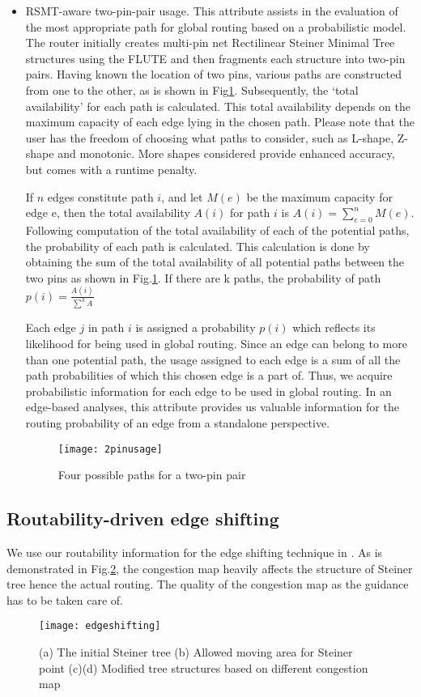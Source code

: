 \begin{itemize}
\item RSMT-aware two-pin-pair usage. This attribute assists in the evaluation of the most appropriate path for global routing based on a probabilistic model. The router initially creates multi-pin net Rectilinear Steiner Minimal Tree structures using the FLUTE \cite{FLUTE} and then fragments each structure into two-pin pairs. Having known the location of two pins, various paths are constructed from one to the other, as is shown in Fig\ref{fig:2pinusage}. Subsequently, the ‘total availability’ for each path is calculated. This total availability depends on the maximum capacity of each edge lying in the chosen path. Please note that the user has the freedom of choosing what paths to consider, such as L-shape, Z-shape and monotonic. More shapes considered provide enhanced accuracy, but comes with a runtime penalty.

If $n$ edges constitute path $i$, and let $M(e)$ be the maximum capacity for edge e, then the total availability $A(i)$ for path $i$ is $A(i)=\sum_{e=0}^{n}M(e)$. Following computation of the total availability of each of the potential paths, the probability of each path is calculated. This calculation is done by obtaining the sum of the total availability of all potential paths between the two pins as shown in Fig.\ref{fig:2pinusage}. If there are k paths, the probability of path $p(i)=\frac{A(i)}{\sum^{k}A}$

Each edge $j$ in path $i$ is assigned a probability $p(i)$ which reflects its likelihood for being used in global routing. Since an edge can belong to more than one potential path, the usage assigned to each edge is a sum of all the path probabilities of which this chosen edge is a part of. Thus, we acquire probabilistic information for each edge to be used in global routing. In an edge-based analyses, this attribute provides us valuable information for the routing probability of an edge from a standalone perspective.
\begin{figure}[htbp]
	\centerline{\texttt{[image: 2pinusage]}}
	\caption{Four possible paths for a two-pin pair}
	\label{fig:2pinusage}
\end{figure}
\end{itemize}

\subsection{Routability-driven edge shifting}
We use our routability information for the edge shifting technique in \cite{fastroute}. As is demonstrated in Fig.\ref{fig:edgeshifting}, the congestion map heavily affects the structure of Steiner tree hence the actual routing. The quality of the congestion map as the guidance has to be taken care of.
\begin{figure}[htbp]
	\centerline{\texttt{[image: edgeshifting]}}
	\caption{(a) The initial Steiner tree (b) Allowed moving area for Steiner point (c)(d) Modified tree structures based on different congestion map}
	\label{fig:edgeshifting}
\end{figure}


